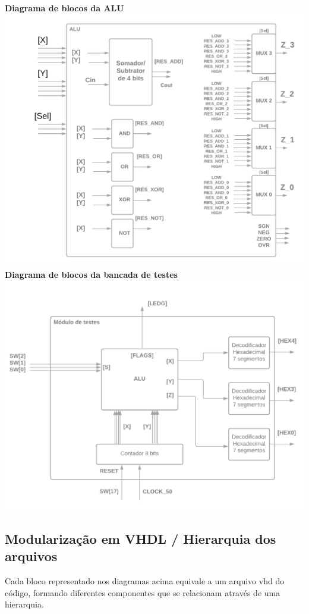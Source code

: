 \documentclass{article}
\begin{document}
\begin{center}
\textbf{Diagrama de blocos da ALU}
\includegraphics[width=\textwidth]{img/DB_ALU.png}
\textbf{Diagrama de blocos da bancada de testes}
\includegraphics[width=\textwidth]{img/DB_Teste.png}
\end{center}

\subsection{Modularização em VHDL / Hierarquia dos arquivos}

Cada bloco representado nos diagramas acima equivale a um arquivo vhd do código,
formando diferentes componentes que se relacionam através de uma hierarquia.
\end{document}
